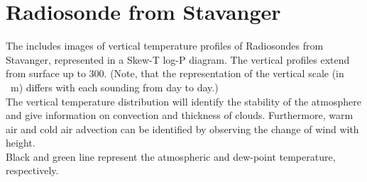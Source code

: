 \section{Radiosonde from Stavanger} \label{sec:Radiosonde}
The  includes images of vertical temperature profiles of Radiosondes from Stavanger, represented in a Skew-T log-P diagram. The vertical profiles extend from surface up to \SI{300}{\hPa}. (Note, that the representation of the vertical scale (in \SI{}{\metre}) differs with each sounding from day to day.)
\\
The vertical temperature distribution will identify the stability of the atmosphere and give information on convection and thickness of clouds. Furthermore, warm air and cold air advection can be identified by observing the change of wind with height.
\\
Black and green line represent the atmospheric and dew-point temperature, respectively.